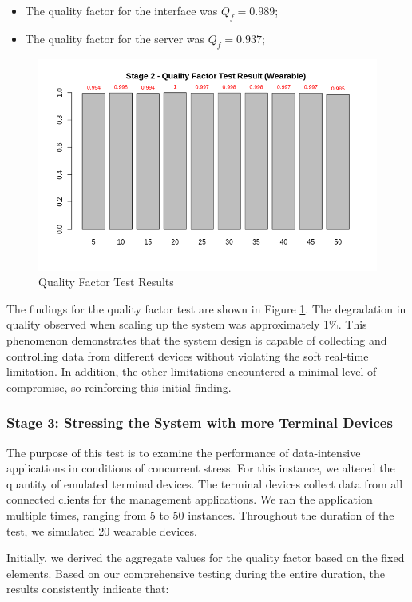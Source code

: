 \begin{itemize}
    \item The quality factor for the interface was $Q_f = 0.989$;
    \item The quality factor for the server was $Q_f = 0.937$;
\end{itemize}

\begin{figure}[h!]
    \centering
    \includegraphics[width=.7\linewidth]{Figures/qf-s2.png}
    \caption{Quality Factor Test Results}
    \label{fig:qf-s2}
\end{figure}

The findings for the quality factor test are shown in Figure \ref{fig:qf-s2}. The degradation in quality observed when scaling up the system was approximately 1\%. This phenomenon demonstrates that the system design is capable of collecting and controlling data from different devices without violating the soft real-time limitation. In addition, the other limitations encountered a minimal level of compromise, so reinforcing this initial finding.

\subsubsection{Stage 3: Stressing the System with more Terminal Devices}

The purpose of this test is to examine the performance of data-intensive applications in conditions of concurrent stress. For this instance, we altered the quantity of emulated terminal devices. The terminal devices collect data from all connected clients for the management applications. We ran the application multiple times, ranging from 5 to 50 instances. Throughout the duration of the test, we simulated 20 wearable devices.

Initially, we derived the aggregate values for the quality factor based on the fixed elements. Based on our comprehensive testing during the entire duration, the results consistently indicate that:

